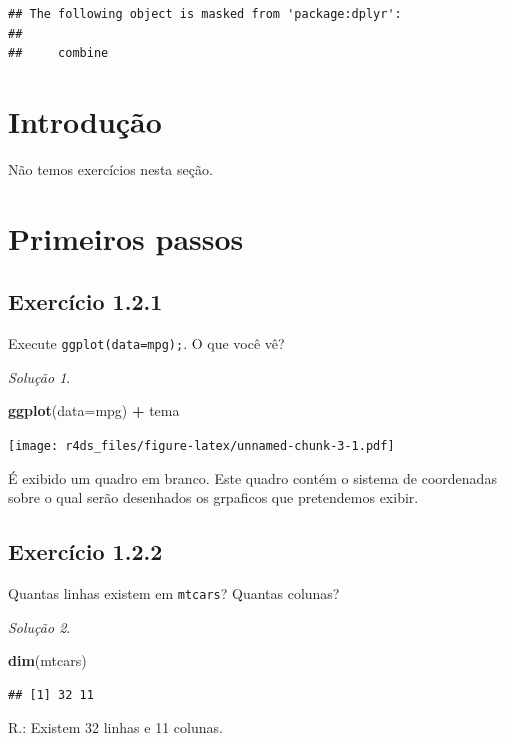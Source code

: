 \documentclass[
]{latex/krantz}
\newenvironment{Shaded}{\begin{snugshade}}{\end{snugshade}}
\newcommand{\AttributeTok}[1]{\textcolor[rgb]{0.13,0.29,0.53}{#1}}
\newcommand{\FunctionTok}[1]{\textcolor[rgb]{0.13,0.29,0.53}{\textbf{#1}}}
\newcommand{\NormalTok}[1]{#1}
\newcommand{\SpecialCharTok}[1]{\textcolor[rgb]{0.81,0.36,0.00}{\textbf{#1}}}
\theoremstyle{definition}
\theoremstyle{definition}
\theoremstyle{definition}
\theoremstyle{definition}
\theoremstyle{remark}
\newtheorem*{solution}{Solução}
\begin{document}
\begin{verbatim}
## The following object is masked from 'package:dplyr':
## 
##     combine
\end{verbatim}

\hypertarget{introduuxe7uxe3o}{%
\section{Introdução}\label{introduuxe7uxe3o}}

Não temos exercícios nesta seção.

\hypertarget{primeiros-passos}{%
\section{Primeiros passos}\label{primeiros-passos}}

\hypertarget{exr1-2-1}{%
\subsection*{Exercício 1.2.1}\label{exr1-2-1}}

Execute \texttt{ggplot(data=mpg);}. O que você vê?

\begin{solution}
\leavevmode

\begin{Shaded}
\begin{Highlighting}[]
\FunctionTok{ggplot}\NormalTok{(}\AttributeTok{data=}\NormalTok{mpg) }\SpecialCharTok{+}
\NormalTok{    tema}
\end{Highlighting}
\end{Shaded}

\texttt{[image: r4ds\_files/figure-latex/unnamed-chunk-3-1.pdf]}

É exibido um quadro em branco. Este quadro contém o sistema de coordenadas sobre o qual serão desenhados os grpaficos que pretendemos exibir.

\end{solution}

\hypertarget{exr1-2-2}{%
\subsection*{Exercício 1.2.2}\label{exr1-2-2}}

Quantas linhas existem em \texttt{mtcars}? Quantas colunas?

\begin{solution}
\leavevmode

\begin{Shaded}
\begin{Highlighting}[]
\FunctionTok{dim}\NormalTok{(mtcars)}
\end{Highlighting}
\end{Shaded}

\begin{verbatim}
## [1] 32 11
\end{verbatim}

R.: Existem 32 linhas e 11 colunas.

\end{solution}
\end{document}
